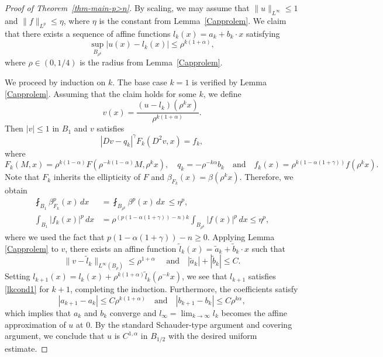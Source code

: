 \documentclass[11pt]{amsart}
\theoremstyle{plain}
\theoremstyle{definition}
\numberwithin{equation}{section}
\begin{document}
\begin{proof}[Proof of Theorem~\ref{thm-main-p>n}]
By scaling, we may assume that $\|u\|_{L^\infty} \leq 1$ and $\|f\|_{L^p}\leq \eta$, where $\eta$ is the constant from Lemma~\ref{Capprolem}.  
We claim that there exists a sequence of affine functions $l_k(x)=a_k+b_k\cdot x$ satisfying
\begin{equation} \label{lkcond1}
    \sup_{B_{\rho^k}}|u(x)-l_k(x)| \leq \rho^{k(1+\alpha)},
\end{equation}
where $\rho\in(0, 1/4)$ is the radius from Lemma~\ref{Capprolem}.

We proceed by induction on $k$.
The base case $k=1$ is verified by Lemma \ref{Capprolem}.
Assuming that the claim holds for some $k$, we define
\begin{equation*}
    v(x)=\frac{(u-l_k)(\rho^kx)}{\rho^{k(1+\alpha)}}.
\end{equation*}
Then $|v| \leq 1$ in $B_1$ and $v$ satisfies 
\begin{equation*}
    |Dv-q_k|^\gamma F_k(D^2v,x) = f_k,
\end{equation*}
where
\begin{equation*}
    F_k(M,x) = \rho^{k(1-\alpha)}F({\rho^{-k(1-\alpha)}}M, \rho^kx), \quad q_k =-\rho^{-k\alpha} b_k \quad \text{and} \quad f_k(x) = \rho^{k(1-\alpha(1+\gamma))}f(\rho^kx).
\end{equation*}
Note that $F_k$ inherits the ellipticity of $F$ and $\beta_{F_k}(x) = \beta(\rho^kx)$.
Therefore, we obtain
\begin{equation*}
    \begin{aligned}
          \fint_{B_1}\beta_{F_k}^p(x) \, dx  &= \fint_{B_{\rho^k}}\beta^p(x) \, dx \, \leq \eta^p, \\
    \int_{B_1}|f_k(x)|^p \, dx  &=  \rho^{(p(1-\alpha(1+\gamma))-n)k} \int_{B_{\rho^k}}|f(x)|^p  \, dx \leq \eta^p,
    \end{aligned}
\end{equation*}
where we used the fact that $p(1-\alpha(1+\gamma))-n\geq0$.
Applying Lemma \ref{Capprolem} to $v$, there exists an affine function $\tilde{l}_k(x) =\tilde{a}_k+ \tilde{b}_k\cdot x$ such that 
\begin{equation*}
     \|v-\tilde{l}_k\|_{L^\infty(B_\rho)} \leq \rho^{1+\alpha} \quad  \text{ and} \quad |\tilde{a}_k|+|\tilde{b}_k| \leq C.
\end{equation*}
Setting $l_{k+1}(x) = l_k(x) + \rho^{k(1+\alpha)} \tilde{l}_k(\rho^{-k}x)$, we see that $l_{k+1}$ satisfies \eqref{lkcond1} for $k+1$, completing the induction.
Furthermore, the coefficients satisfy
\begin{equation*}
    |a_{k+1}-a_k| \leq C\rho^{k(1+\alpha)} \quad \text{and} \quad |b_{k+1}-b_k| \leq C\rho^{k\alpha},
\end{equation*}
which implies that $a_k$ and $b_k$ converge and $l_\infty =\lim_{k\rightarrow \infty} l_k$
becomes the affine approximation of $u$ at 0.
By the standard Schauder-type argument and covering argument, we conclude that $u$ is $C^{1,\alpha}$ in $B_{1/2}$ with the desired uniform estimate.
\end{proof}
\end{document}
